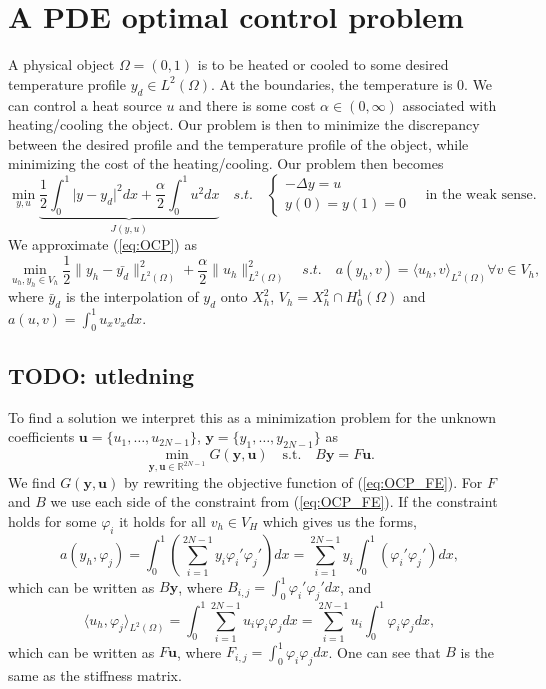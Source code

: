 \section{A PDE optimal control problem}
A physical object $\Omega = (0, 1)$ is to be heated or cooled to some desired temperature profile $y_d \in L^2 (\Omega)$. At the boundaries, the temperature is $0$. 
We can control a heat source $u$ and there is some cost $\alpha \in (0, \infty)$ associated with heating/cooling the object.
Our problem is then to minimize the discrepancy between the desired profile and the temperature profile of the object, while minimizing the cost of the heating/cooling.
Our problem then becomes
\begin{equation}
    \label{eq:OCP}
    \min_{y, u} \underbrace{\frac{1}{2} \int_0^1 \lvert y - y_d \rvert^2 dx + \frac{\alpha}{2}\int_0^1u^2 dx}_{J(y, u)}
    \quad s.t. \quad \begin{cases}
       -\Delta y = u \\
       y(0) = y(1) = 0
    \end{cases} 
    \quad \text{in the weak sense.}
\end{equation}
We approximate (\ref{eq:OCP}) as 
\begin{equation}
    \label{eq:OCP_FE}
    \min_{u_h, y_h \in V_h} \frac{1}{2} \lVert y_h - \bar{y_d} \rVert_ {L^2(\Omega)}^2 + \frac{\alpha}{2} \lVert u_h \rVert_{L^2(\Omega)}^2
    \quad s.t. \quad a(y_h, v) = \langle u_h, v \rangle_{L^2(\Omega)} \forall v \in V_h,
\end{equation}
where $\bar{y}_d$ is the interpolation of $y_d$ onto $X_h^2$, $V_h = X_h^2 \cap H_0^1 (\Omega)$ and $a(u, v) = \int_0^1 u_x v_x dx$.
\subsection{TODO: utledning}
To find a solution we interpret this as a minimization problem for the unknown coefficients $\mathbf{u} = \{u_1, \dots, u_{2N-1} \}$, $\mathbf{y} = \{y_1, \dots, y_{2N-1} \}$ as
\begin{equation}
    \label{eq:OCP_coeff}
    \min_{\mathbf{y,u} \in \mathds{R}^{2N-1}} G(\mathbf{y, u}) \quad \text{s.t.} \quad B\mathbf{y} = F\mathbf{u}.
\end{equation}
We find $G(\mathbf{y, u})$ by rewriting the objective function of (\ref{eq:OCP_FE}).
For $F$ and $B$ we use each side of the constraint from (\ref{eq:OCP_FE}). If the constraint holds for some $\varphi_i$ it holds for all $v_h\in V_H$ which gives us the forms,
$$a(y_h, \varphi_j) = \int_0^1 \left( \sum_{i=1}^{2N-1} y_i \varphi_i' \varphi_j' \right)dx =\sum_{i=1}^{2N-1} y_i\int_0^1 \left( \varphi_i' \varphi_j' \right)dx,$$
which can be written as $B\mathbf{y}$, where $B_{i,j} = \int_0^1 \varphi_i' \varphi_j'dx$, and  
$$\langle u_h, \varphi_j \rangle_{L^2(\Omega)} = \int_0^1 \sum_{i=1}^{2N-1} u_i \varphi_i \varphi_j dx =\sum_{i=1}^{2N-1} u_i \int_0^1  \varphi_i \varphi_j dx,$$
which can be written as $F\mathbf{u}$, where $F_{i,j}=\int_0^1  \varphi_i \varphi_j dx$.
One can see that $B$ is the same as the stiffness matrix.

